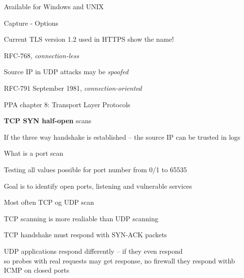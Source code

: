 \documentclass[Screen16to9,17pt]{foils}
\begin{document}


\centerline{}
\centerline{Available for Windows and UNIX}



\centerline{Capture - Options}



\centerline{Current TLS version 1.2 used in HTTPS show the name!}


\begin{list1}
\item RFC-768, \emph{connection-less}
\item Source IP in UDP attacks may be \emph{spoofed}
\end{list1}


\begin{list1}
\item RFC-791 September 1981, \emph{connection-oriented}
\end{list1}



\begin{list2}
\item PPA chapter 8: Transport Layer Protocols
\item {\bfseries TCP SYN half-open} scans
\item If the three way handshake is established -- the source IP can be trusted in logs
\end{list2}



\begin{list1}
\item What is a port scan
\item Testing all values possible for port number from 0/1 to 65535
\item Goal is to identify open ports, listening and vulnerable services
\item Most often TCP og UDP scan
\item TCP scanning is more realiable than UDP scanning
\item TCP handshake must respond with SYN-ACK packets
\item UDP applications respond differently -- if they even respond\\
so probes with real requests may get response, no firewall they respond withb ICMP on closed ports
\end{list1}
\end{document}
